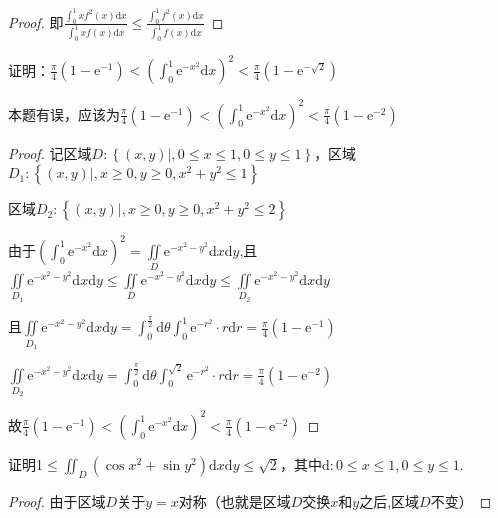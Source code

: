 \begin{xiti}
\begin{proof}
		即$\frac{\int_{0}^{1} x f^{2}(x) \mathrm{d} x}{\int_{0}^{1} x f(x) \mathrm{d} x} \leqslant \frac{\int_{0}^{1} f^{2}(x) \mathrm{d} x}{\int_{0}^{1} f(x) \mathrm{d} x}$
		
	\end{proof}
	\item 证明：$\frac{\pi}{4}\left(1-\mathrm{e}^{-1}\right)<\left(\int_{0}^{1} \mathrm{e}^{-x^{2}} \mathrm{d} x\right)^{2}<\frac{\pi}{4}\left(1-\mathrm{e}^{-\sqrt{2}}\right)$

	\begin{note}
		本题有误，应该为$\frac{\pi}{4}\left(1-\mathrm{e}^{-1}\right)<\left(\int_{0}^{1} \mathrm{e}^{-x^{2}} \mathrm{d} x\right)^{2}<\frac{\pi}{4}\left(1-\mathrm{e}^{-2}\right)$	
	\end{note}

	\begin{proof}		
		记区域$D:\left\{ (x, y) |, 0 \leqslant x \leqslant 1, 0 \leqslant y \leqslant 1 \right\}$，区域$D_{1}:\left\{ (x, y) |, x \geqslant 0, y \geqslant 0, x^{2}+y^{2} \leqslant 1 \right\}$
		
		区域$D_{2}:\left\{ (x, y) |, x \geqslant 0, y \geqslant 0, x^{2}+y^{2} \leqslant 2 \right\}$
		
		由于$\left(\int_{0}^{1} \mathrm{e}^{-x^{2}} \mathrm{d} x\right)^{2}= \iint\limits_{D} \mathrm{e}^{-x^{2}-y^{2}} \mathrm{d} x \mathrm{d} y$,且$\iint\limits_{D_{1}} \mathrm{e}^{-x^{2}-y^{2}} \mathrm{d} x \mathrm{d} y \leqslant \iint\limits_{D} \mathrm{e}^{-x^{2}-y^{2}} \mathrm{d} x \mathrm{d} y \leqslant \iint\limits_{D_{2}} \mathrm{e}^{-x^{2}-y^{2}} \mathrm{d} x \mathrm{d} y$
		
		且$\iint\limits_{D_{1}} \mathrm{e}^{-x^{2}-y^{2}} \mathrm{d} x \mathrm{d} y =\int_{0}^{\frac{\pi}{2} } \mathrm{d} \theta \int_{0}^{1} \mathrm{e}^{-r^{2}} \cdot r \mathrm{d} r = \frac{\pi}{4}\left(1-\mathrm{e}^{-1}\right)$
		
		$\iint\limits_{D_{2}} \mathrm{e}^{-x^{2}-y^{2}} \mathrm{d} x \mathrm{d} y =\int_{0}^{\frac{\pi}{2} } \mathrm{d} \theta \int_{0}^{\sqrt{2}} \mathrm{e}^{-r^{2}} \cdot r \mathrm{d} r =  \frac{\pi}{4}\left(1-\mathrm{e}^{-2}\right)$
		
		故$\frac{\pi}{4}\left(1-\mathrm{e}^{-1}\right)<\left(\int_{0}^{1} \mathrm{e}^{-x^{2}} \mathrm{d} x\right)^{2}<\frac{\pi}{4}\left(1-\mathrm{e}^{-2}\right)$
	\end{proof}
	\item 证明1$\leqslant \iint_{D}\left(\cos x^{2}+\sin y^{2}\right) \mathrm{d} x \mathrm{d} y \leqslant \sqrt{2}$，其中$\mathrm{d}: 0 \leqslant x \leqslant 1,0 \leqslant y \leqslant 1$.
	\begin{proof}
		由于区域$D$关于$y=x$对称（也就是区域$D$交换$x$和$y$之后,区域$D$不变）
		

\end{proof}
\end{xiti}

